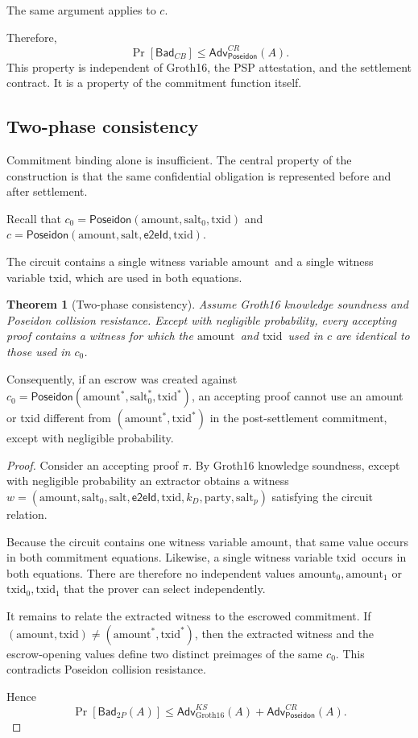 \documentclass[10pt,twocolumn]{article}
\newtheorem{theorem}{Theorem}
\newcommand{\Poseidon}{\ensuremath{\mathsf{Poseidon}}}
\newcommand{\eeid}{\ensuremath{\mathsf{e2eId}}}
\newcommand{\amount}{\ensuremath{\text{amount}}}
\newcommand{\txid}{\ensuremath{\text{txid}}}
\newcommand{\party}{\ensuremath{\text{party}}}
\newcommand{\salt}{\ensuremath{\text{salt}}}
\begin{document}
The same argument applies to $c$.

Therefore,
\begin{equation}
\Pr[\mathsf{Bad}_{CB}] \le \mathsf{Adv}^{CR}_{\Poseidon}(A). \label{eq:badcb}
\end{equation}
This property is independent of Groth16, the PSP attestation, and the
settlement contract. It is a property of the commitment function itself.

\subsection{Two-phase consistency}

Commitment binding alone is insufficient. The central property of the
construction is that the same confidential obligation is represented
before and after settlement.

Recall that $c_0 = \Poseidon(\amount,\salt_0,\txid)$ and
$c = \Poseidon(\amount,\salt,\eeid,\txid)$.

The circuit contains a single witness variable \amount\ and a single
witness variable \txid, which are used in both equations.

\begin{theorem}[Two-phase consistency]
Assume Groth16 knowledge soundness and Poseidon collision resistance.
Except with negligible probability, every accepting proof contains a
witness for which the \amount\ and \txid\ used in $c$ are identical to
those used in $c_0$.
\end{theorem}

Consequently, if an escrow was created against
$c_0 = \Poseidon(\amount^*,\salt_0^*,\txid^*)$, an accepting proof cannot
use an amount or txid different from $(\amount^*,\txid^*)$ in the
post-settlement commitment, except with negligible probability.

\begin{proof}
Consider an accepting proof $\pi$. By Groth16 knowledge soundness, except
with negligible probability an extractor obtains a witness
$w=(\amount,\salt_0,\salt,\eeid,\txid,k_D,\party,\salt_p)$ satisfying the
circuit relation.

Because the circuit contains one witness variable \amount, that same
value occurs in both commitment equations. Likewise, a single witness
variable \txid\ occurs in both equations. There are therefore no
independent values $\amount_0,\amount_1$ or $\txid_0,\txid_1$ that the
prover can select independently.

It remains to relate the extracted witness to the escrowed commitment. If
$(\amount,\txid) \neq (\amount^*,\txid^*)$, then the extracted witness
and the escrow-opening values define two distinct preimages of the same
$c_0$. This contradicts Poseidon collision resistance.

Hence
\begin{equation}
\Pr[\mathsf{Bad}_{2P}(A)] \le \mathsf{Adv}^{KS}_{\mathrm{Groth16}}(A) +
\mathsf{Adv}^{CR}_{\Poseidon}(A). \label{eq:bad2p}
\end{equation}
\end{proof}
\end{document}
